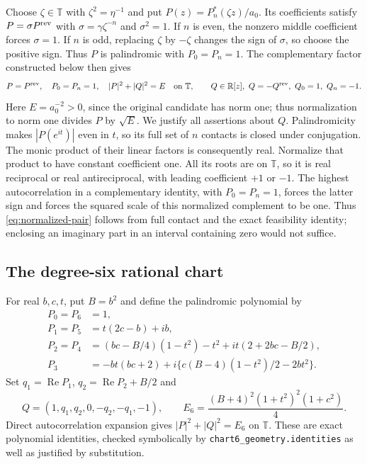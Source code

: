 \documentclass[11pt]{article}
\newcommand{\T}{\mathbb T}
\newcommand{\R}{\mathbb R}
\DeclareMathOperator{\Rea}{Re}
\begin{document}
Choose $\zeta\in\T$ with $\zeta^2=\eta^{-1}$ and put
$P(z)=P_n^*(\zeta z)/a_0$. Its coefficients satisfy
$P=\sigma P^{\rm rev}$ with $\sigma=\gamma\zeta^{-n}$ and
$\sigma^2=1$. If $n$ is even, the nonzero middle coefficient forces
$\sigma=1$. If $n$ is odd, replacing $\zeta$ by $-\zeta$ changes
the sign of $\sigma$, so choose the positive sign. Thus $P$ is
palindromic with $P_0=P_n=1$. The complementary factor constructed
below then gives
\begin{equation}\label{eq:normalized-pair}
 P=P^{\rm rev},\quad P_0=P_n=1,\quad
 |P|^2+|Q|^2=E\quad\hbox{on }\T,
 \qquad Q\in\R[z],\ Q=-Q^{\rm rev},\ Q_0=1,\ Q_n=-1.
\end{equation}
Here $E=a_0^{-2}>0$, since the original candidate has norm one;
thus normalization to norm one divides $P$ by $\sqrt E$.
We justify all assertions about $Q$. Palindromicity makes $|P(e^{it})|$
even in $t$, so its full set of $n$ contacts is closed under conjugation.
The monic product of their linear factors is consequently real. Normalize
that product to have constant coefficient one. All its roots are on
$\T$, so it is real reciprocal or real antireciprocal, with leading
coefficient $+1$ or $-1$. The highest autocorrelation in a complementary
identity, with $P_0=P_n=1$, forces the latter sign and forces the squared
scale of this normalized complement to be one. Thus \eqref{eq:normalized-pair}
follows from full contact and the exact feasibility identity; enclosing
an imaginary part in an interval containing zero would not suffice.

\subsection{The degree-six rational chart}\label{sec:chart6}
For real $b,c,t$, put $B=b^2$ and define the palindromic polynomial by
\begin{align}\label{eq:chart6}
 P_0=P_6&=1,\nonumber\\
 P_1=P_5&=t(2c-b)+ib,\nonumber\\
 P_2=P_4&=(bc-B/4)(1-t^2)-t^2+it(2+2bc-B/2),\\
 P_3&=-bt(bc+2)+i\{c(B-4)(1-t^2)/2-2bt^2\}.\nonumber
\end{align}
Set $q_1=\Rea P_1$, $q_2=\Rea P_2+B/2$ and
\begin{equation}\label{eq:energy6}
 Q=(1,q_1,q_2,0,-q_2,-q_1,-1),\qquad
 E_6=\frac{(B+4)^2(1+t^2)^2(1+c^2)}4.
\end{equation}
Direct autocorrelation expansion gives $|P|^2+|Q|^2=E_6$ on $\T$.
These are exact polynomial identities, checked symbolically by
\texttt{chart6\_geometry.identities} as well as justified by substitution.
\end{document}
